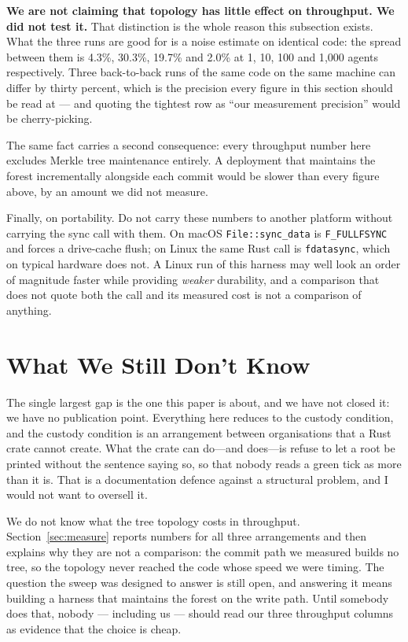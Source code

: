 \documentclass[11pt]{article}
\begin{document}
\textbf{We are not claiming that topology has little effect on throughput. We
did not test it.} That distinction is the whole reason this subsection exists.
What the three runs are good for is a noise estimate on identical code: the
spread between them is 4.3\%, 30.3\%,
19.7\% and 2.0\% at 1, 10, 100 and 1{,}000 agents
respectively. Three back-to-back runs of the same code on the same machine can
differ by thirty percent, which is the precision every figure in this section
should be read at --- and quoting the tightest row as ``our measurement
precision'' would be cherry-picking.

The same fact carries a second consequence: every throughput number here
excludes Merkle tree maintenance entirely. A deployment that maintains the
forest incrementally alongside each commit would be slower than every figure
above, by an amount we did not measure.

Finally, on portability. Do not carry these numbers to another platform
without carrying the sync call with them. On macOS \texttt{File::sync\_data} is
\texttt{F\_FULLFSYNC} and forces a drive-cache flush; on Linux the same Rust
call is \texttt{fdatasync}, which on typical hardware does not. A Linux run of
this harness may well look an order of magnitude faster while
providing \emph{weaker} durability, and a comparison that does not quote both
the call and its measured cost is not a comparison of anything.

\section{What We Still Don't Know}
\label{sec:unknown}

The single largest gap is the one this paper is about, and we have not closed
it: we have no publication point. Everything here reduces to the custody
condition, and the custody condition is an arrangement between organisations
that a Rust crate cannot create. What the crate can do---and does---is refuse
to let a root be printed without the sentence saying so, so that nobody reads a
green tick as more than it is. That is a documentation defence against a
structural problem, and I would not want to oversell it.

We do not know what the tree topology costs in throughput.
Section~\ref{sec:measure} reports numbers for all three arrangements and then
explains why they are not a comparison: the commit path we measured builds no
tree, so the topology never reached the code whose speed we were timing. The
question the sweep was designed to answer is still open, and answering it means
building a harness that maintains the forest on the write path. Until somebody
does that, nobody --- including us --- should read our three throughput columns
as evidence that the choice is cheap.
\end{document}

